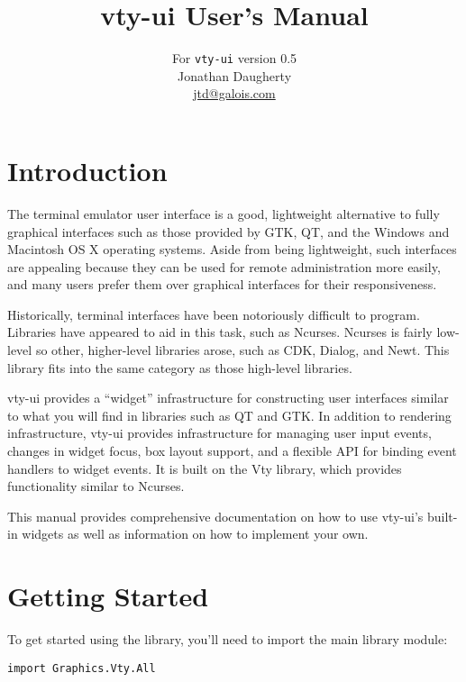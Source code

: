 \documentclass[11pt, letterpaper, oneside, titlepage]{article}
\begin{document}
\vsize 9.0in

\title{vty-ui User's Manual}
\author{
  For \texttt{vty-ui} version 0.5\\
  Jonathan Daugherty\\
  \href{mailto:jtd@galois.com}{jtd@galois.com}
}
\maketitle

\tableofcontents
\newpage

\section{Introduction}

The terminal emulator user interface is a good, lightweight
alternative to fully graphical interfaces such as those provided by
GTK, QT, and the Windows and Macintosh OS X operating systems.  Aside
from being lightweight, such interfaces are appealing because they can
be used for remote administration more easily, and many users prefer
them over graphical interfaces for their responsiveness.

Historically, terminal interfaces have been notoriously difficult to
program.  Libraries have appeared to aid in this task, such as
Ncurses.  Ncurses is fairly low-level so other, higher-level libraries
arose, such as CDK, Dialog, and Newt.  This library fits into the same
category as those high-level libraries.

vty-ui provides a “widget” infrastructure for constructing user
interfaces similar to what you will find in libraries such as QT and
GTK.  In addition to rendering infrastructure, vty-ui provides
infrastructure for managing user input events, changes in widget focus,
box layout support, and a flexible API for binding event handlers to
widget events.  It is built on the Vty library, which provides
functionality similar to Ncurses.

This manual provides comprehensive documentation on how to use
vty-ui's built-in widgets as well as information on how to implement
your own.

\section{Getting Started}

To get started using the library, you'll need to import the main library
module:

\begin{verbatim}
import Graphics.Vty.All
\end{verbatim}
\end{document}
